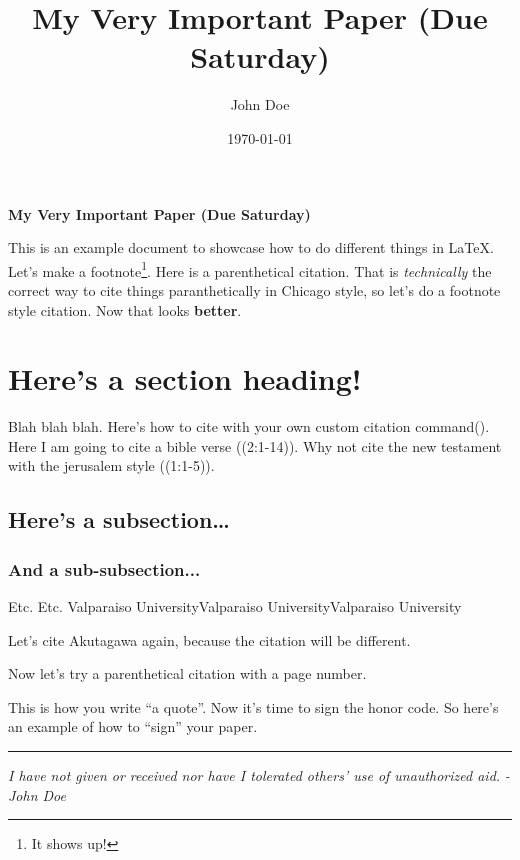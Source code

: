 \documentclass[letterpaper]{turabian-researchpaper}
\title{My Very Important Paper (Due Saturday)}
\subtitle{}
\author{John Doe}
\date{\today}
\newcommand{\ccparencite}[1]{(\citeauthor{#1})}
\newcommand{\vu}{Valparaiso University}
\begin{document}
\maketitle
\doublespacing

\begin{center}
	\textbf{My Very Important Paper (Due Saturday)}
\end{center}


This is an example document to showcase how to do different things in \LaTeX.
Let's make a footnote\footnote{It shows up!}. Here is a parenthetical citation\parencite{kant}.
That is \textit{technically} the correct way to cite things paranthetically in Chicago style, so let's
do a footnote style citation\autocite{akut, 34}. Now that looks \textbf{better}.

\section{Here's a section heading!}


Blah blah blah.
Here's how to cite with your own custom citation command\ccparencite{kant, 23}.
Here I am going to cite a bible verse ((2:1-14)).
Why not cite the new testament with the jerusalem style ((1:1-5)).
\subsection{Here's a subsection\ldots}
\subsubsection{And a sub-subsection...}

Etc. Etc. \vu\vu\vu

Let's cite Akutagawa again\autocite{akut}, because the citation will be different.

Now let's try a parenthetical citation with a page number\parencite{mill, 54}.

This is how you write ``a quote''\parencite*{akut, 84}.
Now it's time to sign the honor code. So here's an example of
how to ``sign'' your paper.

\noindent\rule{\textwidth}{1pt} %
\begin{center}
	\textit{I have not given or received nor have I tolerated others' use of unauthorized aid.}
	\newline
	\textit{- John Doe}
\end{center}

\newpage
\printbibliography
\end{document}
